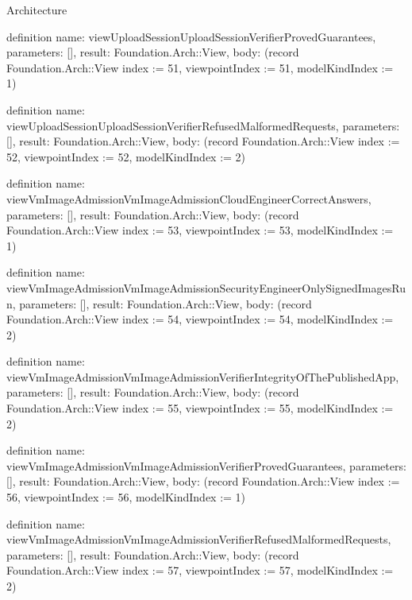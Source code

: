 \begin{lexlean}{Architecture}
\begin{semanticmodule}
definition{
  name: viewUploadSessionUploadSessionVerifierProvedGuarantees,
  parameters: [],
  result: Foundation.Arch::View,
  body: (record Foundation.Arch::View {index := 51, viewpointIndex := 51, modelKindIndex := 1})
}

definition{
  name: viewUploadSessionUploadSessionVerifierRefusedMalformedRequests,
  parameters: [],
  result: Foundation.Arch::View,
  body: (record Foundation.Arch::View {index := 52, viewpointIndex := 52, modelKindIndex := 2})
}

definition{
  name: viewVmImageAdmissionVmImageAdmissionCloudEngineerCorrectAnswers,
  parameters: [],
  result: Foundation.Arch::View,
  body: (record Foundation.Arch::View {index := 53, viewpointIndex := 53, modelKindIndex := 1})
}

definition{
  name: viewVmImageAdmissionVmImageAdmissionSecurityEngineerOnlySignedImagesRun,
  parameters: [],
  result: Foundation.Arch::View,
  body: (record Foundation.Arch::View {index := 54, viewpointIndex := 54, modelKindIndex := 2})
}

definition{
  name: viewVmImageAdmissionVmImageAdmissionVerifierIntegrityOfThePublishedApp,
  parameters: [],
  result: Foundation.Arch::View,
  body: (record Foundation.Arch::View {index := 55, viewpointIndex := 55, modelKindIndex := 2})
}

definition{
  name: viewVmImageAdmissionVmImageAdmissionVerifierProvedGuarantees,
  parameters: [],
  result: Foundation.Arch::View,
  body: (record Foundation.Arch::View {index := 56, viewpointIndex := 56, modelKindIndex := 1})
}

definition{
  name: viewVmImageAdmissionVmImageAdmissionVerifierRefusedMalformedRequests,
  parameters: [],
  result: Foundation.Arch::View,
  body: (record Foundation.Arch::View {index := 57, viewpointIndex := 57, modelKindIndex := 2})
}


\end{semanticmodule}
\end{lexlean}
